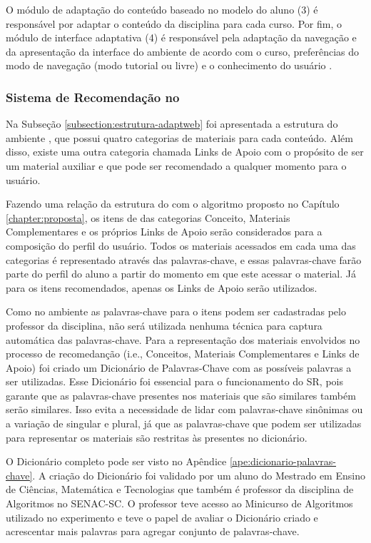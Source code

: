 O módulo de adaptação do conteúdo baseado no modelo do aluno (3) é responsável por adaptar o conteúdo da disciplina
para cada curso. Por fim, o módulo de interface adaptativa (4) é responsável pela adaptação da navegação e da
apresentação da interface do ambiente de acordo com o curso, preferências do modo de navegação (modo tutorial ou livre)
e o conhecimento do usuário \cite{gasparini2003interface}.

\subsubsection{Sistema de Recomendação no \adaptweb}

Na Subseção \ref{subsection:estrutura-adaptweb} foi apresentada a estrutura do ambiente \adaptweb, que possui quatro categorias
de materiais para cada conteúdo. Além disso, existe uma outra categoria chamada Links de Apoio com o propósito de ser um
material auxiliar e que pode ser recomendado a qualquer momento para o usuário.

Fazendo uma relação da estrutura do \adaptweb com o algoritmo proposto no Capítulo \ref{chapter:proposta}, os itens de
das categorias Conceito, Materiais Complementares e os próprios Links de Apoio serão considerados para a composição do perfil do usuário. Todos os
materiais acessados em cada uma das categorias é representado através das palavras-chave, e
essas palavras-chave farão parte do perfil do aluno a partir do momento em que este acessar o material. Já para os itens
recomendados, apenas os Links de Apoio serão utilizados.

Como no ambiente \adaptweb as palavras-chave para o itens podem ser cadastradas pelo professor da disciplina, não será
utilizada nenhuma técnica para captura automática das palavras-chave. Para a representação dos materiais envolvidos no
processo de recomedanção (i.e., Conceitos, Materiais Complementares e Links de Apoio) foi criado um Dicionário de Palavras-Chave
com as possíveis palavras a ser utilizadas. Esse Dicionário foi essencial para o funcionamento do SR, pois garante que as
palavras-chave presentes nos materiais que são similares também serão similares. Isso evita a necessidade de lidar com palavras-chave
sinônimas ou a variação de singular e plural, já que as palavras-chave que podem ser utilizadas para representar os materiais
são restritas às presentes no dicionário.

O Dicionário completo pode ser visto no Apêndice \ref{ape:dicionario-palavras-chave}. A criação do Dicionário foi validado
por um aluno do Mestrado em Ensino de Ciências, Matemática e Tecnologias que também é professor da disciplina de
Algoritmos no SENAC-SC. O professor teve acesso ao Minicurso de Algoritmos utilizado no experimento
e teve o papel de avaliar o Dicionário criado e acrescentar mais palavras para agregar conjunto de palavras-chave.

